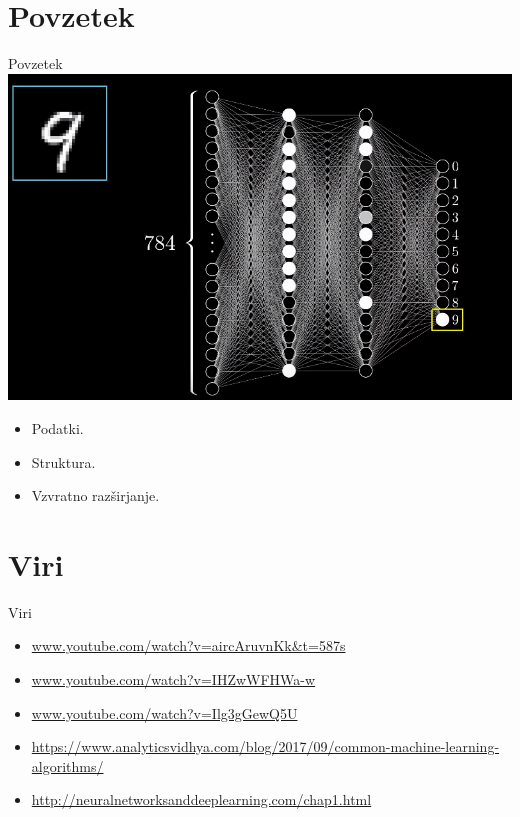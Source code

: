 \documentclass{beamer}
\begin{document}
\section*{Povzetek}

\begin{frame}{Povzetek}
  \includegraphics[scale = 0.35]{photo/foto4} \\

  \begin{itemize}
  \item
    Podatki.
  \item
    Struktura.
  \item
    Vzvratno razširjanje.
  \end{itemize}
  
\end{frame}

\section*{Viri}
\begin{frame}{Viri}
  \begin{itemize}
    \item \url{www.youtube.com/watch?v=aircAruvnKk&t=587s}
    \item \url{www.youtube.com/watch?v=IHZwWFHWa-w}
    \item \url{www.youtube.com/watch?v=Ilg3gGewQ5U}
    \item \url{https://www.analyticsvidhya.com/blog/2017/09/common-machine-learning-algorithms/}
    \item \url{http://neuralnetworksanddeeplearning.com/chap1.html}
  \end{itemize}

\end{frame}
\end{document}
